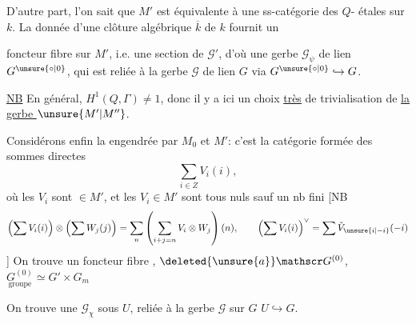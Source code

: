 D'autre part, l'on sait que $M'$ est équivalente à une ss-catégorie  des $Q$- étales sur $k$. La donnée d'une clôture algébrique $\overline k$ de $k$ fournit un

foncteur fibre  sur $M'$, i.e. une section de $\mathscr G'$, d'où une   gerbe $\mathscr G_\psi$ de lien $G^{\unsure{\circ|0}}$, qui  est  reliée à la gerbe $\mathscr G$ de lien $G$ via $G^{\unsure{\circ|0}}\hookrightarrow G$.

\uline{NB} En général, $H^1(Q,\Gamma)\ne1$, donc il y a ici un choix \uline{très}  de trivialisation de \uline{la gerbe $\unsure{M'|M''}$}.

Considérons enfin la    engendrée par $M_0$ et $M'$: c'est la catégorie formée des sommes directes
\[
\sum_{i\in Z}V_i(i),
\]
où les $V_i$ sont $\in M'$, et les $V_i\in M'$ sont tous nuls sauf un nb fini
[NB
\[
\left(\sum V_i(i)\right)\otimes\left(\sum W_j(j)\right)=\sum_n\left(\sum_{i+j=n}V_i\otimes W_j\right)(n),\qquad
\left(\sum V_i(i)\right)^\vee=\sum\check V_{\unsure{i|-i}}(-i)
\]
]
On trouve un foncteur fibre
,
$\deleted{\unsure{a}}\mathscr G^{(0)}$, $\underset{\text{groupe}}{G^{(0)}}\simeq G'\times G_m$

On trouve une   $\mathscr G_\chi$ sous $U$, reliée à la gerbe $\mathscr G$ sur $G$   $U\hookrightarrow G$.

